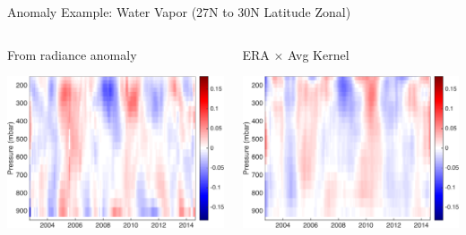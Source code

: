 \documentclass[10pt,t]{beamer}
\begin{document}
\begin{frame}[label={sec:orgaec1bb4}]{Anomaly Example: Water Vapor (27N to 30N Latitude Zonal)}
\vspace{-0.35in}

\begin{columns}
\begin{column}{0.55\columnwidth}
\begin{block}{\footnotesize From radiance anomaly}
\vspace{-0.1in}
\begin{center}
\includegraphics[width=0.8\linewidth]{./oFigs/water_lati_30_UMBC.png}
\end{center}
\end{block}
\end{column}

\begin{column}{0.55\columnwidth}
\begin{block}{\footnotesize ERA \(\times\) Avg Kernel}
\vspace{-0.1in}
\begin{center}
\includegraphics[width=0.8\linewidth]{./oFigs/water_lati_30_ERA.png}
\end{center}
\end{block}
\end{column}
\end{columns}


\end{frame}
\end{document}
